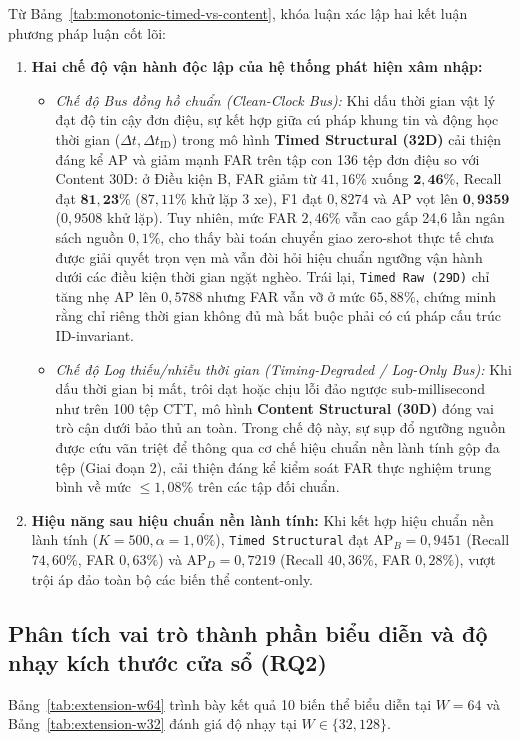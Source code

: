 \documentclass[12pt, a4paper, reqno, oneside]{book}
\DeclareRobustCommand{\code}[1]{\nolinkurl{#1}}
\begin{document}
Từ Bảng~\ref{tab:monotonic-timed-vs-content}, khóa luận xác lập hai kết luận phương pháp luận cốt lõi:
\begin{enumerate}
    \item \textbf{Hai chế độ vận hành độc lập của hệ thống phát hiện xâm nhập:}
    \begin{itemize}
        \item \textit{Chế độ Bus đồng hồ chuẩn (Clean-Clock Bus):} Khi dấu thời gian vật lý đạt độ tin cậy đơn điệu, sự kết hợp giữa cú pháp khung tin và động học thời gian ($\Delta t, \Delta t_{\text{ID}}$) trong mô hình \textbf{Timed Structural (32D)} cải thiện đáng kể AP và giảm mạnh FAR trên tập con 136 tệp đơn điệu so với Content 30D: ở Điều kiện B, FAR giảm từ $41{,}16\%$ xuống $\mathbf{2{,}46\%}$, Recall đạt $\mathbf{81{,}23\%}$ ($87{,}11\%$ khử lặp 3 xe), F1 đạt $0{,}8274$ và AP vọt lên $\mathbf{0{,}9359}$ ($0{,}9508$ khử lặp). Tuy nhiên, mức FAR $2{,}46\%$ vẫn cao gấp 24,6 lần ngân sách nguồn $0{,}1\%$, cho thấy bài toán chuyển giao zero-shot thực tế chưa được giải quyết trọn vẹn mà vẫn đòi hỏi hiệu chuẩn ngưỡng vận hành dưới các điều kiện thời gian ngặt nghèo. Trái lại, \code{Timed Raw (29D)} chỉ tăng nhẹ AP lên $0{,}5788$ nhưng FAR vẫn vỡ ở mức $65{,}88\%$, chứng minh rằng chỉ riêng thời gian không đủ mà bắt buộc phải có cú pháp cấu trúc ID-invariant.
        \item \textit{Chế độ Log thiếu/nhiễu thời gian (Timing-Degraded / Log-Only Bus):} Khi dấu thời gian bị mất, trôi dạt hoặc chịu lỗi đảo ngược sub-millisecond như trên 100 tệp CTT, mô hình \textbf{Content Structural (30D)} đóng vai trò cận dưới bảo thủ an toàn. Trong chế độ này, sự sụp đổ ngưỡng nguồn được cứu vãn triệt để thông qua cơ chế hiệu chuẩn nền lành tính gộp đa tệp (Giai đoạn 2), cải thiện đáng kể kiểm soát FAR thực nghiệm trung bình về mức $\le 1{,}08\%$ trên các tập đối chuẩn.
    \end{itemize}
    \item \textbf{Hiệu năng sau hiệu chuẩn nền lành tính:} Khi kết hợp hiệu chuẩn nền lành tính ($K=500, \alpha=1{,}0\%$), \code{Timed Structural} đạt $\text{AP}_B=0{,}9451$ (Recall $74{,}60\%$, FAR $0{,}63\%$) và $\text{AP}_D=0{,}7219$ (Recall $40{,}36\%$, FAR $0{,}28\%$), vượt trội áp đảo toàn bộ các biến thể content-only.
\end{enumerate}

\subsection{Phân tích vai trò thành phần biểu diễn và độ nhạy kích thước cửa sổ (RQ2)}\label{sec:completion}
Bảng~\ref{tab:extension-w64} trình bày kết quả 10 biến thể biểu diễn tại $W=64$ và Bảng~\ref{tab:extension-w32} đánh giá độ nhạy tại $W \in \{32, 128\}$.
\end{document}
